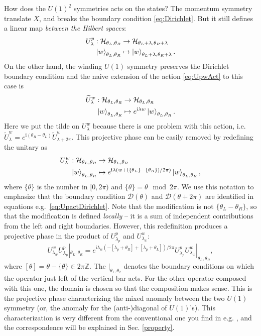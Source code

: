 \documentclass[
]{scrartcl}
\numberwithin{equation}{section}
\renewenvironment{align}{\begin{equation}\begin{aligned}}{\end{aligned}\end{equation}}
\theoremstyle{definition}
\theoremstyle{definition}
\theoremstyle{definition}
\theoremstyle{definition}
\theoremstyle{remark}
\begin{document}
How does the \(U(1)^2\) symmetries acts on the states?
The momentum symmetry translate \(X\), and breaks the boundary condition \eqref{eq:Dirichlet}.
But it still defines a linear map \emph{between the Hilbert spaces}:
\begin{align}
    \label{eq:UpactDirichlet}
    U^p_\lambda : \mathcal{H}_{\theta_L,\theta_R} &\to \mathcal{H}_{\theta_L+\lambda,\theta_R+\lambda}\\
    \ket{w}_{\theta_L,\theta_R} &\mapsto \ket{w}_{\theta_L+\lambda,\theta_R+\lambda}.
\end{align}
On the other hand, the winding \(U(1)\) symmetry preserves the Dirichlet boundary condition and the naive extension of the action \eqref{eq:UpwAct} to this case is
\begin{align}
    \label{eq:tildeUwactDirichlet}
    \widetilde{U}^w_\lambda : \mathcal{H}_{\theta_L,\theta_R} &\to \mathcal{H}_{\theta_L,\theta_R}\\
    \ket{w}_{\theta_L,\theta_R} &\mapsto e^{\mathrm{i}\lambda w}\ket{w}_{\theta_L,\theta_R}.
\end{align}
Here we put the tilde on \(U^w_\lambda\) because there is one problem with this action, i.e.~\(\widetilde{U}^w_\lambda = e^{\mathrm{i}(\theta_R-\theta_L)}\widetilde{U}^w_{\lambda+2\pi}\).
This projective phase can be easily removed by redefining the unitary as
\begin{align}
    \label{eq:UwactDirichlet}
    U^w_\lambda : \mathcal{H}_{\theta_L,\theta_R} &\to \mathcal{H}_{\theta_L,\theta_R}\\
    \ket{w}_{\theta_L,\theta_R} &\mapsto e^{\mathrm{i}\lambda (w+(\{\theta_L\}-\{\theta_R\})/2\pi)}\ket{w}_{\theta_L,\theta_R},
\end{align}
where \(\{\theta\}\) is the number in \([0,2\pi)\) and \(\{\theta\} = \theta \mod 2\pi\).
We use this notation to emphasize that the boundary condition \(\mathcal{D}(\theta)\) and \(\mathcal{D}(\theta+2\pi)\) are identified in equations e.g.~\eqref{eq:UpactDirichlet}.
Note that the modification is not \(\{\theta_L-\theta_R\}\), so that the modification is defined \emph{locally} -- it is a sum of independent contributions from the left and right boundaries.
However, this redefinition produces a projective phase in the product of \(U^p_{\lambda_p}\) and \(U^w_{\lambda_w}\):
\begin{equation}
    \label{eq:UpUwcomu}
    U^w_{\lambda_w}U^p_{\lambda_p}|_{\theta_L,\theta_R} = e^{\mathrm{i}\lambda_w(-[\lambda_p+\theta_R] + [\lambda_p+\theta_L])/2\pi} U^p_{\lambda_p}U^w_{\lambda_w}|_{\theta_L,\theta_R},
\end{equation}
where \([\theta] = \theta - \{\theta\} \in 2\pi \mathbb{Z}\).
The \(|_{\theta_1,\theta_2}\) denotes the boundary conditions on which the operator just left of the vertical bar acts. For the other operator composed with this one, the domain is chosen so that the composition makes sense.
This is the projective phase characterizing the mixed anomaly between the two \(U(1)\) symmetry (or, the anomaly for the (anti-)diagonal of \(U(1)\)'s).
This characterization is very different from the conventional one you find in e.g. \textcite{PolchinskiVol1}, and the correspondence will be explained in Sec. \ref{property}.
\end{document}
